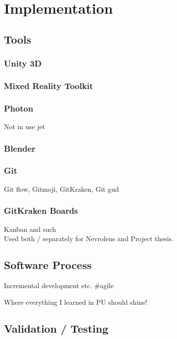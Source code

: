 


\chapter{Implementation}

\section{Tools}\label{chap:tools}


\subsection*{Unity 3D}\label{chap:unity}

\subsection*{Mixed Reality Toolkit}\label{chap:mrtk}


\subsection*{Photon}\label{chap:photon}
Not in use jet

\subsection*{Blender}

\subsection*{Git}
Git flow, Gitmoji, GitKraken, Git gud 

\subsection*{GitKraken Boards}
Kanban and such \\
Used both / separately for Nevrolens and Project thesis.


\section{Software Process}
Incremental development etc. \#agile

\large{Where everything I learned in PU should shine!}

\section{Validation / Testing}


